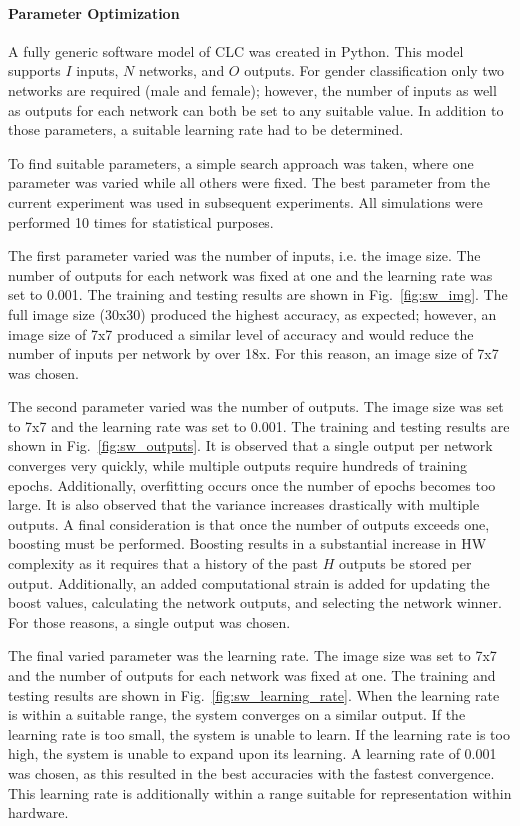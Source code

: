 \documentclass[10pt,journal]{IEEEtran}
\newcommand{\fig}[1]{Fig.~\ref{#1}}
\begin{document}
			\paragraph{Parameter Optimization}
				A fully generic software model of CLC was created in Python. This model supports \(I\) inputs, \(N\) networks, and \(O\) outputs. For gender classification only two networks are required (male and female); however, the number of inputs as well as outputs for each network can both be set to any suitable value. In addition to those parameters, a suitable learning rate had to be determined.
				
				To find suitable parameters, a simple search approach was taken, where one parameter was varied while all others were fixed. The best parameter from the current experiment was used in subsequent experiments. All simulations were performed 10 times for statistical purposes.
				
				The first parameter varied was the number of inputs, i.e. the image size. The number of outputs for each network was fixed at one and the learning rate was set to 0.001. The training and testing results are shown in \fig{fig:sw_img}. The full image size (30x30) produced the highest accuracy, as expected; however, an image size of 7x7 produced a similar level of accuracy and would reduce the number of inputs per network by over 18x. For this reason, an image size of 7x7 was chosen.
				
				The second parameter varied was the number of outputs. The image size was set to 7x7 and the learning rate was set to 0.001. The training and testing results are shown in \fig{fig:sw_outputs}. It is observed that a single output per network converges very quickly, while multiple outputs require hundreds of training epochs. Additionally, overfitting occurs once the number of epochs becomes too large. It is also observed that the variance increases drastically with multiple outputs. A final consideration is that once the number of outputs exceeds one, boosting must be performed. Boosting results in a substantial increase in HW complexity as it requires that a history of the past \(H\) outputs be stored per output. Additionally, an added computational strain is added for updating the boost values, calculating the network outputs, and selecting the network winner. For those reasons, a single output was chosen.
				
				The final varied parameter was the learning rate. The image size was set to 7x7 and the number of outputs for each network was fixed at one. The training and testing results are shown in \fig{fig:sw_learning_rate}. When the learning rate is within a suitable range, the system converges on a similar output. If the learning rate is too small, the system is unable to learn. If the learning rate is too high, the system is unable to expand upon its learning. A learning rate of 0.001 was chosen, as this resulted in the best accuracies with the fastest convergence. This learning rate is additionally within a range suitable for representation within hardware.
				
\end{document}
